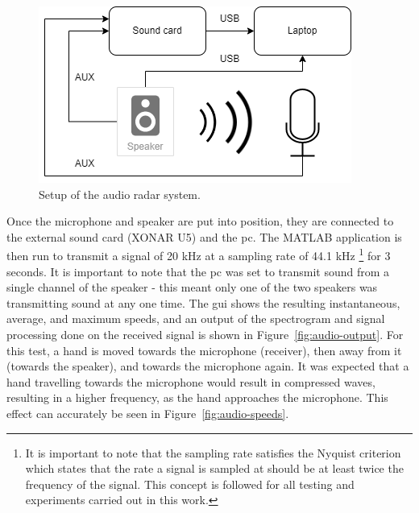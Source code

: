 \documentclass[class=report,11pt,crop=false]{standalone}
\begin{document}
\begin{figure}[htbp]
    \centering
    \includegraphics[width=0.6\columnwidth]{../Images/audio_setup.drawio.png}
    \caption{Setup of the audio \gls{radar} system.}
    \label{fig:audio-setup}
\end{figure}

Once the microphone and speaker are put into position, they are connected to the external sound card (XONAR U5) and the \gls{pc}. The \textsc{MATLAB} application is then run to transmit a signal of 20 kHz at a sampling rate of 44.1 kHz \footnote{It is important to note that the sampling rate satisfies the Nyquist criterion which states that the rate a signal is sampled at should be at least twice the frequency of the signal. This concept is followed for all testing and experiments carried out in this work.} for 3 seconds. It is important to note that the \gls{pc} was set to transmit sound from a single channel of the speaker - this meant only one of the two speakers was transmitting sound at any one time. The \gls{gui} shows the resulting instantaneous, average, and maximum speeds, and an output of the spectrogram and signal processing done on the received signal is shown in Figure~\ref{fig:audio-output}. For this test, a hand is moved towards the microphone (receiver), then away from it (towards the speaker), and towards the microphone again. It was expected that a hand travelling towards the microphone would result in compressed waves, resulting in a higher frequency, as the hand approaches the microphone. This effect can accurately be seen in Figure~\ref{fig:audio-speeds}.
\end{document}
